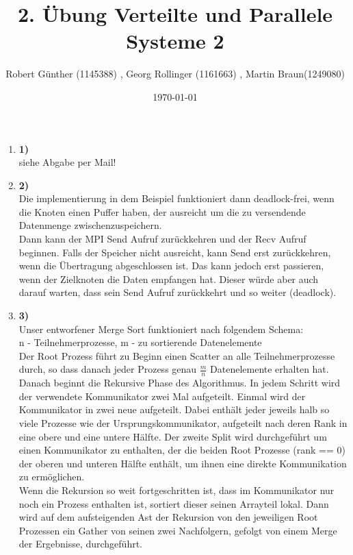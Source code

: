 \documentclass[10pt,a4paper]{article}
\title{2. Übung Verteilte und Parallele Systeme 2}
\author{ Robert Günther (1145388) , Georg Rollinger (1161663) , Martin Braun(1249080)}
\date{\today{}}
\begin{document}
\maketitle
\begin{enumerate}

\item[]{\textbf{1)} \\
siehe Abgabe per Mail!
}

\item[]{\textbf{2)} \\
Die implementierung in dem Beispiel funktioniert dann deadlock-frei, wenn die Knoten einen Puffer haben, der ausreicht um die zu versendende Datenmenge zwischenzuspeichern.\\
Dann kann der MPI Send Aufruf zurückkehren und der Recv Aufruf beginnen. Falls der Speicher nicht ausreicht, kann Send erst zurückkehren, wenn die Übertragung abgeschlossen ist.
Das kann jedoch erst passieren, wenn der Zielknoten die Daten empfangen hat. Dieser würde aber auch darauf warten, dass sein Send Aufruf zurückkehrt und so weiter (deadlock).
}

\item[]{\textbf{3)} \\
Unser entworfener Merge Sort funktioniert nach folgendem Schema: \\
n - Teilnehmerprozesse, m - zu sortierende Datenelemente \\
Der Root Prozess führt zu Beginn einen Scatter an alle Teilnehmerprozesse durch, so dass danach jeder Prozess genau $\frac{m}{n}$ Datenelemente erhalten hat. 
Danach beginnt die Rekursive Phase des Algorithmus. In jedem Schritt wird der verwendete Kommunikator zwei Mal aufgeteilt.
Einmal wird der Kommunikator in zwei neue aufgeteilt. Dabei enthält jeder jeweils halb so viele Prozesse wie der Ursprungskommunikator, aufgeteilt nach deren Rank in eine obere und eine untere Hälfte. 
Der zweite Split wird durchgeführt um einen Kommunikator zu enthalten, der die beiden Root Prozesse (rank == 0) der oberen und unteren Hälfte enthält, um ihnen eine direkte Kommunikation zu ermöglichen.\\

Wenn die Rekursion so weit fortgeschritten ist, dass im Kommunikator nur noch ein Prozess enthalten ist, sortiert dieser seinen Arrayteil lokal. Dann wird auf dem aufsteigenden Ast der Rekursion von den jeweiligen Root Prozessen ein Gather von seinen zwei Nachfolgern, gefolgt von einem Merge der Ergebnisse, durchgeführt.
}
\end{enumerate}
\end{document}

